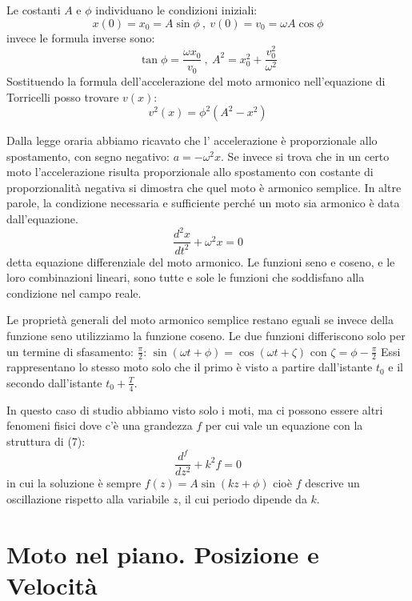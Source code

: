 \documentclass[class=book, crop=false, oneside, 12pt]{standalone}
\begin{document}
Le costanti \(A\) e \(\phi\) individuano le condizioni iniziali:
\begin{equation}
  x(0) = x_0 = A \sin \phi \ , \
  v(0) = v_0 = \omega A \cos \phi
\end{equation}
invece le formula inverse sono:
\begin{equation}
  \tan \phi = \frac{\omega x_0}{v_0} \ , \ 
  A^2 = x_0^2 + \frac {v_0^2}{\omega^2}
\end{equation}
Sostituendo la formula dell'accelerazione del moto armonico nell'equazione di Torricelli posso trovare \(v(x)\):
\begin{equation}
  v^2(x) = \phi^2 (A^2 - x^2) 
\end{equation}

Dalla legge oraria abbiamo ricavato che l' accelerazione è proporzionale allo spostamento, con segno negativo: \(a = - \omega^2 x\). Se invece si trova che in un certo moto l'accelerazione risulta proporzionale allo spostamento con costante di proporzionalità negativa si dimostra che quel moto è armonico semplice. 
In altre parole, la condizione necessaria e sufficiente perché un moto sia armonico è data dall'equazione.
\begin{equation}
  \frac{d^2 x}{dt^2} + \omega^2 x = 0
\end{equation}
detta equazione differenziale del moto armonico. Le funzioni seno e coseno, e le loro combinazioni lineari, sono tutte e sole le funzioni che soddisfano alla condizione nel campo reale. 

Le proprietà generali del moto armonico semplice restano eguali se invece della funzione seno utilizziamo la funzione coseno. 
Le due funzioni differiscono solo per un termine di sfasamento: \(\frac{\pi}{2}\): \(\sin(\omega t + \phi) = \cos(\omega t + \zeta)\) con \(\zeta = \phi - \frac{\pi}{2}\)
Essi rappresentano lo stesso moto solo che il primo è visto a partire dall'istante $t_0$ e il secondo dall'istante \(t_0 + \frac{T}{4}\).

In questo caso di studio abbiamo visto solo i moti, ma ci possono essere altri fenomeni fisici dove c'è una grandezza \(f\) per cui vale un equazione con la struttura di (7):
\begin{equation}
  \frac {d^f} { dz^2} + k^2 f = 0
\end{equation}
in cui la soluzione è sempre \(f(z) = A \sin(kz + \phi)\) cioè \(f\) descrive un oscillazione rispetto alla variabile \(z\), il cui periodo dipende da \(k\).

\section{Moto nel piano. Posizione e Velocità}
\end{document}
